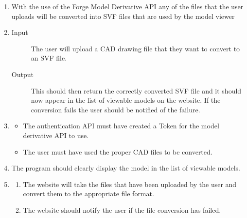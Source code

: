 \documentclass[letterpaper, 10pt, draftclsnofoot, compsoc, onecolumn]{IEEEtran}
\begin{document}
\begin{enumerate}
	\item With the use of the Forge Model Derivative API any of the files that the user uploads will be converted into SVF files
	that are used by the model viewer
	
	\item
	\begin{description}
		\item[Input] The user will upload a CAD drawing file that they want to convert to an SVF file. 
		\item[Output] This should then return the correctly converted SVF file and it should now appear in the list of 
		viewable models on the website. If the conversion fails the user should be notified of the failure.
	\end{description}

	\item
	\begin{itemize}
		\item The authentication API must have created a Token for the model derivative API to use.
		\item The user must have used the proper CAD files to be converted. 
	\end{itemize}

	\item The program should clearly display the model in the list of viewable models.

	\item
	\begin{enumerate}
		\item The website will take the files that have been uploaded by the user and convert them to the appropriate file
		format.
		\item The website should notify the user if the file conversion has failed.
	\end{enumerate}   
\end{enumerate}
\end{document}
